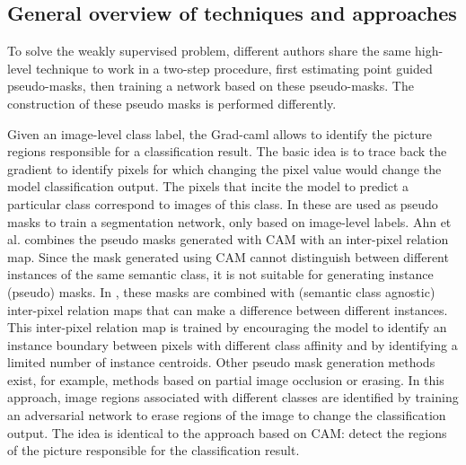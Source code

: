 \subsection{General overview of techniques and approaches}
\par{
    To solve the weakly supervised problem, different authors\cite{Laradji2019,Laradji2019a, Ahn2019,McEver2020} share the same high-level technique to work in a two-step procedure, first estimating point guided pseudo-masks, then training a network based on these pseudo-masks.
    The construction of these pseudo masks is performed differently.
}
\par{
    Given an image-level class label, the Grad-\Gls{caml} \cite{Selvaraju2020} allows to identify the picture regions responsible for a classification result.
    The basic idea is to trace back the gradient to identify pixels for which changing the pixel value would change the model classification output.
    The pixels that incite the model to predict a particular class correspond to images of this class. In \cite{Selvaraju2020} these are used as pseudo masks to train a segmentation network, only based on image-level labels.
    Ahn et al. \cite{Ahn2019} combines the pseudo masks generated with CAM with an inter-pixel relation map.
    Since the mask generated using CAM cannot distinguish between different instances of the same semantic class, it is not suitable for generating instance (pseudo) masks.
    In \cite{Ahn2019}, these masks are combined with (semantic class agnostic) inter-pixel relation maps that can make a difference between different instances.
    This inter-pixel relation map is trained by encouraging the model to identify an instance boundary between pixels with different class affinity and by identifying a limited number of instance centroids.
    Other pseudo mask generation methods exist, for example, methods based on partial image occlusion or erasing\cite{Wei2017}.
    In this approach, image regions associated with different classes are identified by training an adversarial network to erase regions of the image to change the classification output.
    The idea is identical to the approach based on CAM: detect the regions of the picture responsible for the classification result.
}
